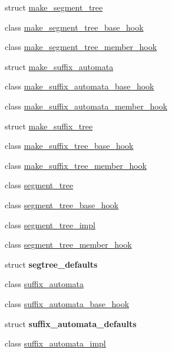 \begin{DoxyCompactItemize}
struct \hyperlink{structboost_1_1intrusive_1_1make__segment__tree}{make\+\_\+segment\+\_\+tree}
\item 
class \hyperlink{classboost_1_1intrusive_1_1make__segment__tree__base__hook}{make\+\_\+segment\+\_\+tree\+\_\+base\+\_\+hook}
\item 
class \hyperlink{classboost_1_1intrusive_1_1make__segment__tree__member__hook}{make\+\_\+segment\+\_\+tree\+\_\+member\+\_\+hook}
\item 
struct \hyperlink{structboost_1_1intrusive_1_1make__suffix__automata}{make\+\_\+suffix\+\_\+automata}
\item 
class \hyperlink{classboost_1_1intrusive_1_1make__suffix__automata__base__hook}{make\+\_\+suffix\+\_\+automata\+\_\+base\+\_\+hook}
\item 
class \hyperlink{classboost_1_1intrusive_1_1make__suffix__automata__member__hook}{make\+\_\+suffix\+\_\+automata\+\_\+member\+\_\+hook}
\item 
struct \hyperlink{structboost_1_1intrusive_1_1make__suffix__tree}{make\+\_\+suffix\+\_\+tree}
\item 
class \hyperlink{classboost_1_1intrusive_1_1make__suffix__tree__base__hook}{make\+\_\+suffix\+\_\+tree\+\_\+base\+\_\+hook}
\item 
class \hyperlink{classboost_1_1intrusive_1_1make__suffix__tree__member__hook}{make\+\_\+suffix\+\_\+tree\+\_\+member\+\_\+hook}
\item 
class \hyperlink{classboost_1_1intrusive_1_1segment__tree}{segment\+\_\+tree}
\item 
class \hyperlink{classboost_1_1intrusive_1_1segment__tree__base__hook}{segment\+\_\+tree\+\_\+base\+\_\+hook}
\item 
class \hyperlink{classboost_1_1intrusive_1_1segment__tree__impl}{segment\+\_\+tree\+\_\+impl}
\item 
class \hyperlink{classboost_1_1intrusive_1_1segment__tree__member__hook}{segment\+\_\+tree\+\_\+member\+\_\+hook}
\item 
struct {\bfseries segtree\+\_\+defaults}
\item 
class \hyperlink{classboost_1_1intrusive_1_1suffix__automata}{suffix\+\_\+automata}
\item 
class \hyperlink{classboost_1_1intrusive_1_1suffix__automata__base__hook}{suffix\+\_\+automata\+\_\+base\+\_\+hook}
\item 
struct {\bfseries suffix\+\_\+automata\+\_\+defaults}
\item 
class \hyperlink{classboost_1_1intrusive_1_1suffix__automata__impl}{suffix\+\_\+automata\+\_\+impl}

\end{DoxyCompactItemize}
